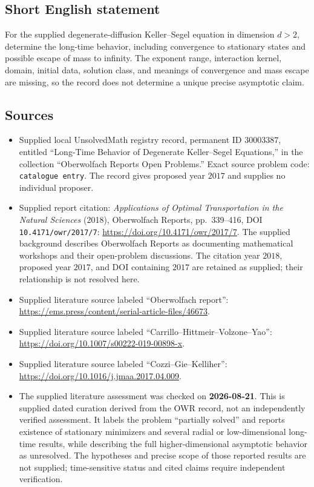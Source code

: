 \documentclass[11pt]{article}
\begin{document}
\subsection{Short English statement}
For the supplied degenerate-diffusion Keller--Segel equation in dimension \(d>2\), determine the long-time behavior, including convergence to stationary states and possible escape of mass to infinity. The exponent range, interaction kernel, domain, initial data, solution class, and meanings of convergence and mass escape are missing, so the record does not determine a unique precise asymptotic claim.
\subsection{Sources}
\begin{itemize}
\item Supplied local UnsolvedMath registry record, permanent ID \(30003387\), entitled ``Long-Time Behavior of Degenerate Keller--Segel Equations,'' in the collection ``Oberwolfach Reports Open Problems.'' Exact source problem code: \texttt{catalogue entry}. The record gives proposed year \(2017\) and supplies no individual proposer.
\item Supplied report citation: \emph{Applications of Optimal Transportation in the Natural Sciences} (2018), Oberwolfach Reports, pp.~339--416, DOI \texttt{10.4171/owr/2017/7}: \url{https://doi.org/10.4171/owr/2017/7}. The supplied background describes Oberwolfach Reports as documenting mathematical workshops and their open-problem discussions. The citation year \(2018\), proposed year \(2017\), and DOI containing \(2017\) are retained as supplied; their relationship is not resolved here.
\item Supplied literature source labeled ``Oberwolfach report'': \url{https://ems.press/content/serial-article-files/46673}.
\item Supplied literature source labeled ``Carrillo--Hittmeir--Volzone--Yao'': \url{https://doi.org/10.1007/s00222-019-00898-x}.
\item Supplied literature source labeled ``Cozzi--Gie--Kelliher'': \url{https://doi.org/10.1016/j.jmaa.2017.04.009}.
\item The supplied literature assessment was checked on \textbf{2026-08-21}. This is supplied dated curation derived from the OWR record, not an independently verified assessment. It labels the problem ``partially solved'' and reports existence of stationary minimizers and several radial or low-dimensional long-time results, while describing the full higher-dimensional asymptotic behavior as unresolved. The hypotheses and precise scope of those reported results are not supplied; time-sensitive status and cited claims require independent verification.
\end{itemize}
\end{document}

